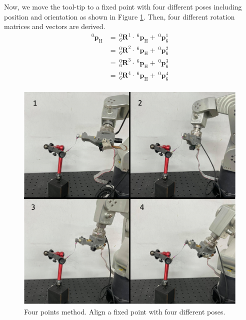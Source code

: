 \par\noindent
Now, we move the tool-tip to a fixed point with four different poses including position and orientation as shown in Figure \ref{fig:four point}. Then, four different rotation matrices and vectors are derived. 
\begin{equation}
\label{eq:four-points}
\begin{split}			
^\mathrm{0}\!\boldsymbol{p}_\mathrm{H}&=\  _{\mathrm{6}}^{\mathrm{0}}\mathbf{R}^1 \cdot\ ^\mathrm{6}\!\boldsymbol{p}_\mathrm{H} +\ ^\mathrm{0}\!\boldsymbol{p}_\mathrm{6}^1\\
					  						&=\  _{\mathrm{6}}^{\mathrm{0}}\mathbf{R}^2 \cdot\ ^\mathrm{6}\!\boldsymbol{p}_\mathrm{H} +\ ^\mathrm{0}\!\boldsymbol{p}_\mathrm{6}^2\\
					  						&=\  _{\mathrm{6}}^{\mathrm{0}}\mathbf{R}^3 \cdot\ ^\mathrm{6}\!\boldsymbol{p}_\mathrm{H} +\ ^\mathrm{0}\!\boldsymbol{p}_\mathrm{6}^3\\
					 					 	&=\  _{\mathrm{6}}^{\mathrm{0}}\mathbf{R}^4 \cdot\ ^\mathrm{6}\!\boldsymbol{p}_\mathrm{H} +\ ^\mathrm{0}\!\boldsymbol{p}_\mathrm{6}^4\\
\end{split}
\end{equation}
\begin{figure}[htbp]
\begin{center}
\includegraphics[width=0.55\linewidth]{Images/four point.png}
\caption{
Four points method. Align a fixed point with four different poses.
}\label{fig:four point}
\end{center}
\end{figure}
